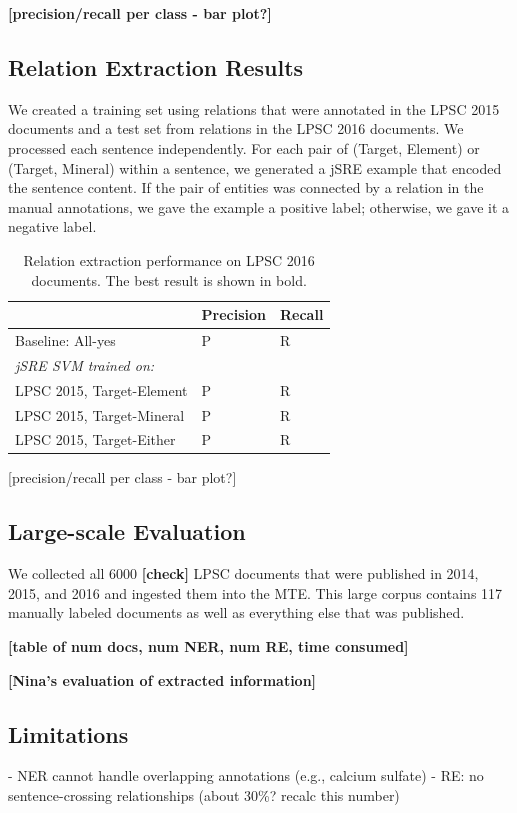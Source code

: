 \documentclass[letterpaper]{article} %
\begin{document}
{\bf [precision/recall per class - bar plot?]}

\subsection{Relation Extraction Results}

We created a training set using relations that were annotated in the
LPSC 2015 documents and a test set from relations in the LPSC 2016
documents.  We processed each sentence independently.  For each pair
of (Target, Element) or (Target, Mineral) within a sentence, we
generated a jSRE example that encoded the sentence content.  If the
pair of entities was connected by a relation in the manual
annotations, we gave the example a positive label; otherwise, we gave
it a negative label.

\begin{table}
\caption{Relation extraction performance on LPSC 2016 documents. 
The best result is shown in bold.}
\label{tab:re}
\begin{center}
\begin{tabular}{l|ll}
 & Precision & Recall \\ \hline
Baseline: All-yes & P & R \\ \hline
{\em jSRE SVM trained on:} & & \\
LPSC 2015, Target-Element & P & R \\
LPSC 2015, Target-Mineral & P & R \\
LPSC 2015, Target-Either  & P & R \\
\hline
\end{tabular}
\end{center}
\end{table}

[precision/recall per class - bar plot?]

\subsection{Large-scale Evaluation}

We collected all 6000 {\bf [check]} LPSC documents that were published
in 2014, 2015, and 2016 and ingested them into the MTE.  This large
corpus contains 117 manually labeled documents as well as everything
else that was published.

{\bf [table of num docs, num NER, num RE, time consumed]}

{\bf [Nina's evaluation of extracted information]}

\subsection{Limitations}
- NER cannot handle overlapping annotations (e.g., calcium sulfate)
- RE: no sentence-crossing relationships (about 30\%? recalc this number)
\end{document}
